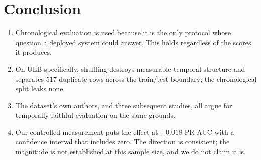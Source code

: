 \documentclass[11pt,a4paper]{article}
\begin{document}
\section{Conclusion}
\begin{enumerate}[itemsep=3pt]
      \item Chronological evaluation is used because it is the only protocol whose question a
            deployed system could answer. This holds regardless of the scores it produces.
      \item On ULB specifically, shuffling destroys measurable temporal structure and separates
            $517$ duplicate rows across the train/test boundary; the chronological split leaks
            none.
      \item The dataset's own authors, and three subsequent studies, all argue for temporally
            faithful evaluation on the same grounds.
      \item Our controlled measurement puts the effect at $+0.018$ PR-AUC with a confidence
            interval that includes zero. The direction is consistent; the magnitude is not
            established at this sample size, and we do not claim it is.
\end{enumerate}
\end{document}
